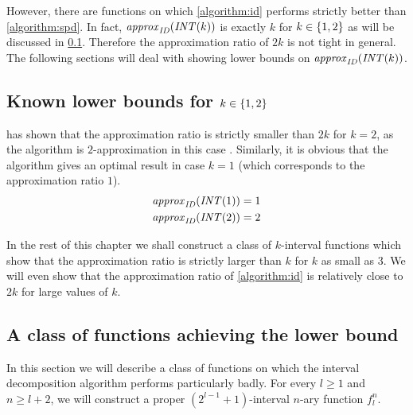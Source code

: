 However,
there are functions on which \cref{algorithm:id} performs strictly better than \cref{algorithm:spd}.
In fact, $\mathit{approx}_{\mathit{ID}} (\mathit{INT} (k))$ is exactly $k$
for $k \in \{1, 2\}$
as will be discussed in \cref{sec:approxidk12}.
Therefore the approximation ratio of $2k$ is not tight
in general.
The following sections will deal with
showing lower bounds on $\mathit{approx}_{\mathit{ID}} (\mathit{INT} (k))$.

\subsection{Known lower bounds for \texorpdfstring{$k \in \{1, 2\}$}{k = 1 or 2}}
\label{sec:approxidk12}

\citeauthor{Dubovsky2012} has shown
that the approximation ratio is strictly smaller than $2k$
for $k = 2$,
as the algorithm is $2$-approximation
in this case \citep[p.~39]{Dubovsky2012}. %
Similarly,
it is obvious that the algorithm
gives an optimal result in case $k = 1$
(which corresponds to the approximation ratio $1$).
\begin{align}
\mathit{approx}_{\mathit{ID}} (\mathit{INT} (1)) &= 1 \\
\mathit{approx}_{\mathit{ID}} (\mathit{INT} (2)) &= 2
\end{align}

In the rest of this chapter
we shall construct a class of $k$-interval functions which show that the approximation ratio is strictly larger than $k$ for $k$ as small as $3$.
We will even show that the approximation ratio of \cref{algorithm:id} is relatively close to $2k$ for large values of $k$.

\subsection{A class of functions achieving the lower bound}
\label{sec:difficultfns}

In this section we will describe a class of functions
on which the interval decomposition algorithm
performs particularly badly.
For every $l \geq 1$ and $n \geq l+2$,
we will construct
a proper $(2^{l-1} + 1)$-interval $n$-ary function $f_l^n$.

